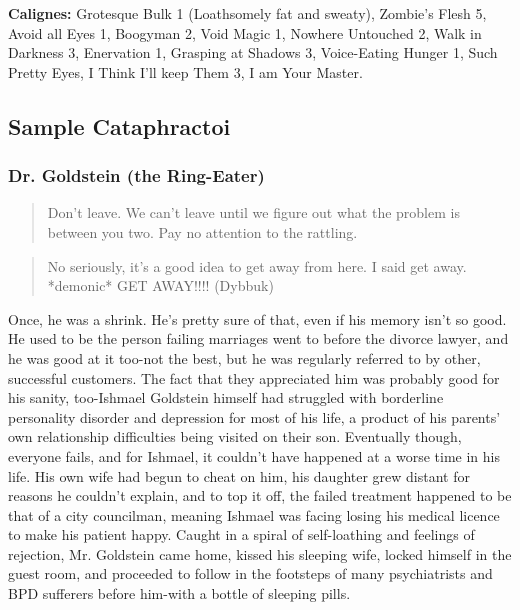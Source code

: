 \noindent \textbf{Calignes:} Grotesque Bulk 1 (Loathsomely fat and sweaty), Zombie's Flesh 5, Avoid all Eyes 1, Boogyman 2, Void Magic 1, Nowhere Untouched 2, Walk in Darkness 3, Enervation 1, Grasping at Shadows 3, Voice-Eating Hunger 1, Such Pretty Eyes, I Think I'll keep Them 3, I am Your Master.

\subsection*{Sample Cataphractoi}

\subsubsection*{Dr. Goldstein (the Ring-Eater)}

\begin{quote}Don't leave. We can't leave until we figure out what the problem is between you two. Pay no attention to the rattling. \end{quote}

\begin{quote}No seriously, it's a good idea to get away from here. I said get away. *demonic* GET AWAY!!!! (Dybbuk)\end{quote}

Once, he was a shrink. He's pretty sure of that, even if his memory isn't so good. He used to be the person failing marriages went to before the divorce lawyer, and he was good at it too-not the best, but he was regularly referred to by other, successful customers. The fact that they appreciated him was probably good for his sanity, too-Ishmael Goldstein himself had struggled with borderline personality disorder and depression for most of his life, a product of his parents' own relationship difficulties being visited on their son. Eventually though, everyone fails, and for Ishmael, it couldn't have happened at a worse time in his life. His own wife had begun to cheat on him, his daughter grew distant for reasons he couldn't explain, and to top it off, the failed treatment happened to be that of a city councilman, meaning Ishmael was facing losing his medical licence to make his patient happy. Caught in a spiral of self-loathing and feelings of rejection, Mr. Goldstein came home, kissed his sleeping wife, 
locked himself in the guest room, and proceeded to follow in the footsteps of many psychiatrists and BPD sufferers before him-with a bottle of sleeping pills.


